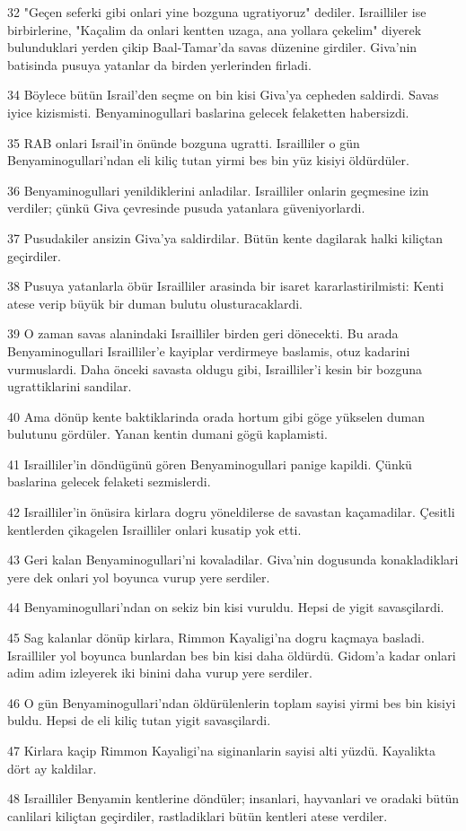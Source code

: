 \par 32 "Geçen seferki gibi onlari yine bozguna ugratiyoruz" dediler. Israilliler ise birbirlerine, "Kaçalim da onlari kentten uzaga, ana yollara çekelim" diyerek bulunduklari yerden çikip Baal-Tamar'da savas düzenine girdiler. Giva'nin batisinda pusuya yatanlar da birden yerlerinden firladi.
\par 34 Böylece bütün Israil'den seçme on bin kisi Giva'ya cepheden saldirdi. Savas iyice kizismisti. Benyaminogullari baslarina gelecek felaketten habersizdi.
\par 35 RAB onlari Israil'in önünde bozguna ugratti. Israilliler o gün Benyaminogullari'ndan eli kiliç tutan yirmi bes bin yüz kisiyi öldürdüler.
\par 36 Benyaminogullari yenildiklerini anladilar. Israilliler onlarin geçmesine izin verdiler; çünkü Giva çevresinde pusuda yatanlara güveniyorlardi.
\par 37 Pusudakiler ansizin Giva'ya saldirdilar. Bütün kente dagilarak halki kiliçtan geçirdiler.
\par 38 Pusuya yatanlarla öbür Israilliler arasinda bir isaret kararlastirilmisti: Kenti atese verip büyük bir duman bulutu olusturacaklardi.
\par 39 O zaman savas alanindaki Israilliler birden geri dönecekti. Bu arada Benyaminogullari Israilliler'e kayiplar verdirmeye baslamis, otuz kadarini vurmuslardi. Daha önceki savasta oldugu gibi, Israilliler'i kesin bir bozguna ugrattiklarini sandilar.
\par 40 Ama dönüp kente baktiklarinda orada hortum gibi göge yükselen duman bulutunu gördüler. Yanan kentin dumani gögü kaplamisti.
\par 41 Israilliler'in döndügünü gören Benyaminogullari panige kapildi. Çünkü baslarina gelecek felaketi sezmislerdi.
\par 42 Israilliler'in önüsira kirlara dogru yöneldilerse de savastan kaçamadilar. Çesitli kentlerden çikagelen Israilliler onlari kusatip yok etti.
\par 43 Geri kalan Benyaminogullari'ni kovaladilar. Giva'nin dogusunda konakladiklari yere dek onlari yol boyunca vurup yere serdiler.
\par 44 Benyaminogullari'ndan on sekiz bin kisi vuruldu. Hepsi de yigit savasçilardi.
\par 45 Sag kalanlar dönüp kirlara, Rimmon Kayaligi'na dogru kaçmaya basladi. Israilliler yol boyunca bunlardan bes bin kisi daha öldürdü. Gidom'a kadar onlari adim adim izleyerek iki binini daha vurup yere serdiler.
\par 46 O gün Benyaminogullari'ndan öldürülenlerin toplam sayisi yirmi bes bin kisiyi buldu. Hepsi de eli kiliç tutan yigit savasçilardi.
\par 47 Kirlara kaçip Rimmon Kayaligi'na siginanlarin sayisi alti yüzdü. Kayalikta dört ay kaldilar.
\par 48 Israilliler Benyamin kentlerine döndüler; insanlari, hayvanlari ve oradaki bütün canlilari kiliçtan geçirdiler, rastladiklari bütün kentleri atese verdiler.

